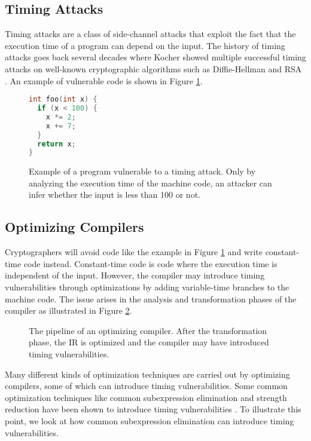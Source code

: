 \subsection{Timing Attacks}
Timing attacks are a class of side-channel attacks that exploit the fact that the execution time of a program can depend on the input.
The history of timing attacks goes back several decades where Kocher showed multiple successful timing attacks on well-known cryptographic algorithms such as Diffie-Hellman and RSA \citep{1996-timing-attacks}.
An example of vulnerable code is shown in Figure \ref{fig:timing-attack-example}.
\begin{figure}[H]
  \begin{lstlisting}[style=defstyle,language=C, xleftmargin=6.8cm, xrightmargin=6.8cm]
int foo(int x) {
  if (x < 100) {
    x *= 2;
    x += 7;
  }
  return x;
} \end{lstlisting} 
  \caption{Example of a program vulnerable to a timing attack. 
  Only by analyzing the execution time of the machine code, an attacker can infer whether the input is less than 100 or not.}
  \label{fig:timing-attack-example}
\end{figure}

\subsection{Optimizing Compilers}
Cryptographers will avoid code like the example in Figure \ref{fig:timing-attack-example} and write constant-time code instead.
Constant-time code is code where the execution time is independent of the input.
However, the compiler may introduce timing vulnerabilities through optimizations by adding variable-time branches to the machine code.
The issue arises in the analysis and transformation phases of the compiler as illustrated in Figure \ref{fig:optimizing-compiler-pipeline}.

\begin{figure}[H]
  \centering
  
  \caption{The pipeline of an optimizing compiler. After the transformation phase, the IR is optimized and the compiler may have introduced timing vulnerabilities.}
  \label{fig:optimizing-compiler-pipeline}
\end{figure}

Many different kinds of optimization techniques are carried out by optimizing compilers, some of which can introduce timing vulnerabilities.
Some common optimization techniques like common subexpression elimination and strength reduction have been shown to introduce timing vulnerabilities \citep{optimizations-linked-to-timing-attacks}.
To illustrate this point, we look at how common subexpression elimination can introduce timing vulnerabilities.

